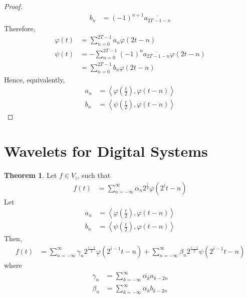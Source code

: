 \documentclass[titlepage, fleqn, a4paper, 12pt, twoside]{article}
\theoremstyle{definition}
\theoremstyle{theorem}
\newtheorem{theorem}{Theorem}
\begin{document}
\begin{proof}
\begin{align*}
		b_n &= (-1)^{n + 1} \overline{a_{2 T - 1 - n}}
	\end{align*}
	Therefore,
	\begin{align*}
		\varphi(t) &= \sum\limits_{n = 0}^{2 T - 1} a_n \varphi(2 t - n)\\
		\psi(t) &= -\sum\limits_{n = 0}^{2 T - 1} (-1)^n \overline{a_{2 T - 1 - n}} \varphi(2 t - n)\\
		&= \sum\limits_{n = 0}^{2 T - 1} b_n \varphi(2 t - n)
	\end{align*}
	Hence, equivalently,
	\begin{align*}
		a_n &= \left\langle \varphi\left( \frac{t}{2} \right) , \varphi(t - n) \right\rangle\\
		b_n &= \left\langle \psi\left( \frac{t}{2} \right) , \varphi(t - n) \right\rangle
	\end{align*}
\end{proof}

\section{Wavelets for Digital Systems}

\begin{theorem}
	Let $f \in V_i$, such that
	\begin{align*}
		f(t) &= \sum\limits_{n = -\infty}^{\infty} \alpha_n 2^{\frac{i}{2}} \varphi\left( 2^i t - n \right)
	\end{align*}
	Let
	\begin{align*}
		a_n &= \left\langle \varphi\left( \frac{t}{2} \right) , \varphi(t - n) \right\rangle\\
		b_n &= \left\langle \psi\left( \frac{t}{2} \right) , \varphi(t - n) \right\rangle
	\end{align*}
	Then,
	\begin{align*}
		f(t) &= \sum\limits_{n = -\infty}^{\infty} \gamma_n 2^{\frac{i - 1}{2}} \varphi\left( 2^{i - 1} t - n \right) + \sum\limits_{n = -\infty}^{\infty} \beta_n 2^{\frac{i - 1}{2}} \psi\left( 2^{i - 1} t - n \right)
	\end{align*}
	where
	\begin{align*}
		\gamma_n &= \sum\limits_{k = -\infty}^{\infty} \overline{\alpha_k} a_{k - 2 n}\\
		\beta_n &= \sum\limits_{k = -\infty}^{\infty} \overline{\alpha_k} b_{k - 2 n}
	\end{align*}
\end{theorem}
\end{document}
